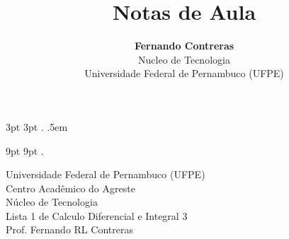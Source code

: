 \theoremstyle{note}
\newtheorem{note}{Note}

  {3pt}%
  {3pt}%
  {\itshape}%
  {}%
  {\bfseries}%
  {.}%
  {.5em}%
  {}%

\theoremstyle{citing}
\newtheorem*{varthm}{}%

  {9pt}%
  {9pt}%
  {\itshape}%
  {}%
  {\bfseries}%
  {.}%
  {\newline}%
  {}%

\theoremstyle{break}
\newtheorem{bthm}{B-Theorem}

\theoremstyle{exercise}
\newtheorem{exer}{Exercise}

\swapnumbers
\theoremstyle{plain}
\newtheorem{thmsw}{Theorem}[section]
\newtheorem{propsw}{Proposition}

\let\lvert=|\let\rvert=|
\newcommand{\Ric}{\mathop{\mathrm{Ric}}\nolimits}

\addtolength{\textwidth}{8pt}

\title{ \textbf{Notas de Aula}}

\author{\textbf{Fernando Contreras}\\
	\large Nucleo de Tecnologia\\
	Universidade Federal de Pernambuco (UFPE)}




	\begin{center}
		Universidade Federal de Pernambuco (UFPE)\\
		Centro Acadêmico do Agreste\\
		Núcleo de Tecnologia\\
		
		Lista 1 de Calculo Diferencial e Integral 3\\
		Prof. Fernando RL Contreras
	\end{center}


